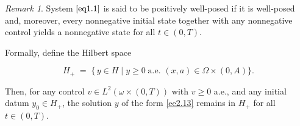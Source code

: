 \documentclass[10pt, a4]{amsart}
\theoremstyle{plain}
\theoremstyle{definition}
\theoremstyle{remark}
\newtheorem{remark}[lemma]{Remark}
\numberwithin{equation}{section}
\begin{document}
\begin{remark}
System $\eqref{eq1.1}$ is said to be  positively well-posed if it is well-posed and, moreover, every nonnegative initial state together with any nonnegative control yields a nonnegative state for all $t\in(0,T)$.

Formally, define the Hilbert space

$$
H_+ \;=\;\bigl\{\,y\in H\;\big|\;y\ge0\;\text{a.e. }(x,a)\in\Omega\times(0,A)\bigr\}.
$$

Then, for any control $v\in L^2(\omega\times(0,T))$ with $v\ge0$ a.e., and any initial datum $y_0\in H_+$, the solution $y$ of the form \eqref{ee2.13} remains in $H_+$ for all $t\in (0,T)$.
\end{remark}
\end{document}
